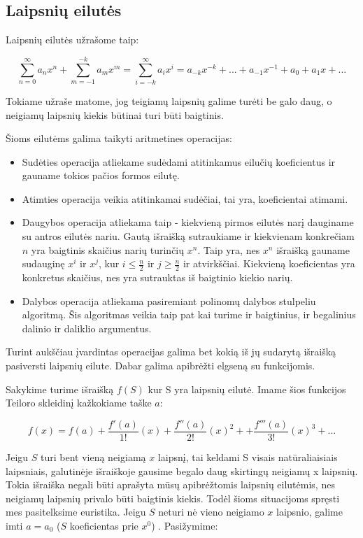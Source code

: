 	
\subsection{Laipsnių eilutės}
	
	Laipsnių eilutės užrašome taip:
	
	\[\sum_{n=0}^{\infty} a_nx^n + \sum_{m=-1}^{-k} a_mx^m = \sum_{i=-k}^{\infty} a_ix^i  = a_{-k} x^{-k} + ... + a_{-1} x^{-1} + a_0 + a_1 x + ... \]
	
	Tokiame užraše matome, jog teigiamų laipsnių galime turėti be galo daug, o neigiamų laipsnių kiekis būtinai turi būti baigtinis.
	
	Šioms eilutėms galima taikyti aritmetines operacijas:
	
	\begin{itemize}
		\item Sudėties operacija atliekame sudėdami atitinkamus eilučių koeficientus ir gauname tokios pačios formos eilutę.
		\item Atimties operacija veikia atitinkamai sudėčiai, tai yra, koeficientai atimami.
		\item Daugybos operacija atliekama taip - kiekvieną pirmos eilutės narį dauginame su antros eilutės nariu.
			  Gautą išraišką sutraukiame ir kiekvienam konkrečiam $n$ yra baigtinis skaičius narių turinčių $x^n$.
			  Taip yra, nes $x^n$ išraišką gauname sudauginę $x^i$ ir $x^j$, kur $i \leq \frac{n}{2}$ ir $j \geq \frac{n}{2}$ ir atvirkščiai.
			  Kiekvieną koeficientas yra konkretus skaičius, nes yra sutrauktas iš baigtinio kiekio narių.
		\item Dalybos operacija atliekama pasiremiant polinomų dalybos stulpeliu algoritmą. 
			  Šis algoritmas veikia taip pat kai turime ir baigtinius, ir begalinius dalinio ir daliklio argumentus.
	\end{itemize}
	
	Turint aukščiau įvardintas operacijas galima bet kokią iš jų sudarytą išraišką pasiversti laipsnių eilute.
	Dabar galima apibrėžti elgseną su funkcijomis.
	
	Sakykime turime išraišką $f(S)$ kur S yra laipsnių eilutė. 
	Imame šios funkcijos Teiloro skleidinį kažkokiame taške $a$: 
	
	\[f(x) = f(a) + \frac{f'(a)}{1!}(x)+\frac{f''(a)}{2!}(x)^2 + +\frac{f'''(a)}{3!}(x)^3 + ...\]
	
	Jeigu $S$ turi bent vieną neigiamą $x$ laipsnį, tai keldami S visais natūraliaisiais laipsniais, galutinėje išraiškoje gausime begalo daug skirtingų neigiamų x laipsnių.
	Tokia išraiška negali būti aprašyta mūsų apibrėžtomis laipsnių eilutėmis, nes neigiamų laipsnių privalo būti baigtinis kiekis. 
	Todėl šioms situacijoms spręsti mes pasitelksime euristika.
	Jeigu $S$ neturi nė vieno neigiamo $x$ laipsnio, galime imti $a = a_0$ ($S$ koeficientas prie $x^0$) .
	Pasižymime:
	
